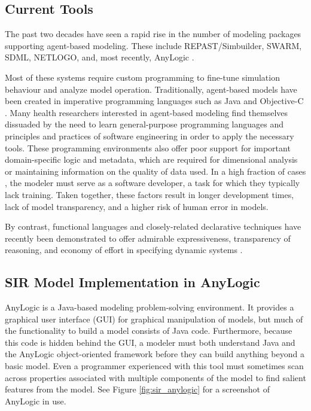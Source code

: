 \documentclass{sig-alternate}
\begin{document}
\subsection{Current Tools}
The past two decades have seen a rapid rise in the number of modeling packages supporting agent-based modeling.  These include REPAST/Simbuilder, SWARM, SDML, NETLOGO, and, most recently, AnyLogic \cite{North:2006:ECT:1122012.1122013, North2005, RePEc:wop:safiwp:96-06-042, Tisue04netlogo:design, springerlink:10.1023/A:1009600530279, anylogic}.

Most of these systems require custom programming to fine-tune simulation behaviour and analyze model operation.  Traditionally, agent-based models have been created in imperative programming languages such as Java and Objective-C \cite{system_dyn_approaches, system_dyn_tradeoffs,anylogic,Tisue04netlogo:design}. Many health researchers interested in agent-based modeling find themselves dissuaded by the need to learn general-purpose programming languages and principles and practices of software engineering in order to apply the necessary tools. These  programming environments also offer poor support for important domain-specific logic and metadata, which are required for dimensional analysis or maintaining information on the quality of data used.  In a high fraction of cases \cite{system_dyn_tradeoffs}, the modeler must serve as a software developer, a task for which they typically lack training. Taken together, these factors result in longer development times, lack of model transparency, and a higher risk of human error in models.  

By contrast, functional languages and closely-related declarative techniques have recently been demonstrated to offer admirable expressiveness, transparency of reasoning, and economy of effort in specifying dynamic systems \cite{system_dyn_approaches, system_dyn_tradeoffs}.


\subsection{SIR Model Implementation in AnyLogic}

AnyLogic is a Java-based modeling problem-solving environment. It provides a graphical user interface (GUI) for graphical manipulation of models, but much of the functionality to build a model consists of Java code. Furthermore, because this code is hidden behind the GUI, a modeler must both understand Java and the AnyLogic object-oriented framework before they can build anything beyond a basic model. Even a programmer experienced with this tool must sometimes scan across properties associated with multiple components of the model to find salient features from the model. See Figure \ref{fig:sir_anylogic} for a screenshot of AnyLogic in use.
\end{document}
